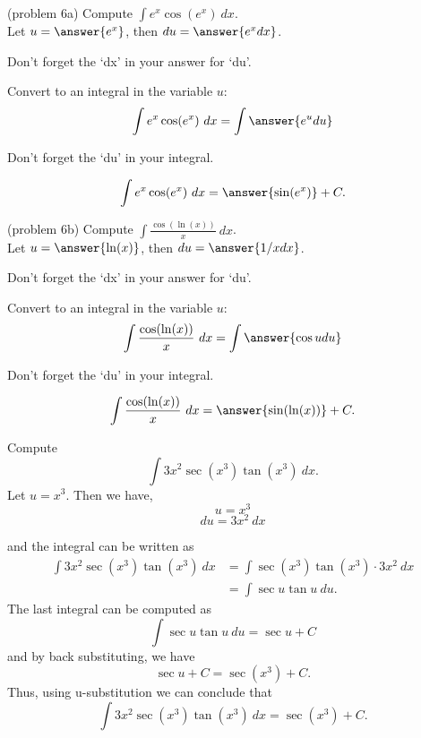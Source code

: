 \documentclass[handout]{ximera}
\begin{document}
\begin{problem}(problem 6a) 
Compute $\displaystyle{\int e^x\cos(e^x) \ dx}$.\\
Let $u = \answer{e^x}$, then $du = \answer{e^x dx}$.\\
\begin{hint}
Don't forget the `dx' in your answer for `du'.
\end{hint}
Convert to an integral in the variable $u$:
\[\int e^x\cos(e^x) \ dx = \int\answer{e^u du}\]
\begin{hint}
Don't forget the `du' in your integral.
\end{hint}

\[\int e^x\cos(e^x) \ dx = \answer{\sin(e^x)} +C.\]
\end{problem}



\begin{problem}(problem 6b) 
Compute $\displaystyle{\int \frac{\cos(\ln(x))}{x} \ dx}$.\\
Let $u = \answer{\ln(x)}$, then $du = \answer{1/x dx}$.\\
\begin{hint}
Don't forget the `dx' in your answer for `du'.
\end{hint}
Convert to an integral in the variable $u$:
\[\int \frac{\cos(\ln(x))}{x} \ dx = \int\answer{\cos u du}\]
\begin{hint}
Don't forget the `du' in your integral.
\end{hint}

\[\int \frac{\cos(\ln(x))}{x} \ dx = \answer{\sin(\ln(x))} +C.\]
\end{problem}



\begin{example}[example 7] Compute 
\[\int 3x^2\sec(x^3)\tan(x^3) \ dx.\]
Let $u = x^3$.  Then we have,
\[u = x^3\]
\[du = 3x^2 \ dx\]

and the integral can be written as 
\begin{align*}
\int 3x^2\sec(x^3)\tan(x^3) \ dx &= \int \sec(x^3)\tan(x^3) \cdot 3x^2 \ dx\\
&= \int \sec u\tan u \ du.
\end{align*}
The last integral can be computed as 
\[\int \sec u\tan u \ du = \sec u + C\]
and by back substituting, we have 
\[\sec u + C = \sec(x^3) + C.\]
Thus, using u-substitution we can conclude that
\[\int 3x^2\sec(x^3)\tan(x^3) \ dx =  \sec(x^3) + C.\]
\end{example}
\end{document}
